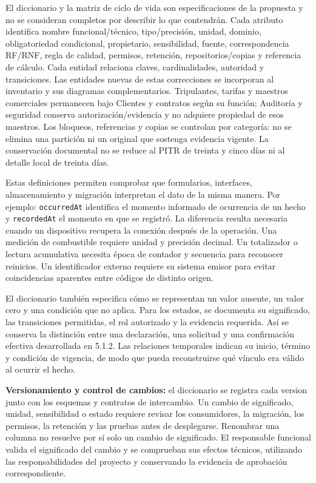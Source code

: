 El diccionario y la matriz de ciclo de vida son especificaciones de la propuesta y no se consideran completos por describir lo que contendrán. Cada atributo identifica nombre funcional/técnico, tipo/precisión, unidad, dominio, obligatoriedad condicional, propietario, sensibilidad, fuente, correspondencia RF/RNF, regla de calidad, permisos, retención, repositorios/copias y referencia de cálculo. Cada entidad relaciona claves, cardinalidades, autoridad y transiciones. Las entidades nuevas de estas correcciones se incorporan al inventario y sus diagramas complementarios.
Tripulantes, tarifas y maestros comerciales permanecen bajo Clientes y contratos según su función; Auditoría y seguridad conserva autorización/evidencia y no adquiere propiedad de esos maestros. Los bloqueos, referencias y copias se controlan por categoría: no se elimina una partición ni un original que sostenga evidencia vigente. La conservación documental no se reduce al PITR de treinta y cinco días ni al detalle local de treinta días.

Estas definiciones permiten comprobar que formularios, interfaces, almacenamiento y migración interpretan el dato de la misma manera. Por ejemplo: \texttt{occurredAt} identifica el momento informado de ocurrencia de un hecho y \texttt{recordedAt} el momento en que se registró. La diferencia resulta necesaria cuando un dispositivo recupera la conexión después de la operación. Una medición de combustible requiere unidad y precisión decimal. Un totalizador o lectura acumulativa necesita época de contador y secuencia para reconocer reinicios. Un identificador externo requiere su sistema emisor para evitar coincidencias aparentes entre códigos de distinto origen.

El diccionario también especifica cómo se representan un valor ausente, un valor cero y una condición que no aplica. Para los estados, se documenta su significado, las transiciones permitidas, el rol autorizado y la evidencia requerida. Así se conserva la distinción entre una declaración, una solicitud y una confirmación efectiva desarrollada en 5.1.2. Las relaciones temporales indican su inicio, término y condición de vigencia, de modo que pueda reconstruirse qué vínculo era válido al ocurrir el hecho.

\textbf{Versionamiento y control de cambios:} el diccionario se registra cada version junto con los esquemas y contratos de intercambio. Un cambio de significado, unidad, sensibilidad o estado requiere revisar los consumidores, la migración, los permisos, la retención y las pruebas antes de desplegarse. Renombrar una columna no resuelve por sí solo un cambio de significado. El responsable funcional valida el significado del cambio y se comprueban sus efectos técnicos, utilizando las responsabilidades del proyecto y conservando la evidencia de aprobación correspondiente.

